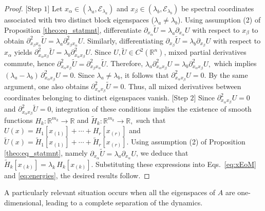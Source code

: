 \documentclass{rendiconti}
\begin{document}
\begin{proof}
%
$[$Step $1]$
Let $x_\alpha \in (\lambda_a, \mathcal{E}_{\lambda_a})$ and $x_\beta \in (\lambda_b, \mathcal{E}_{\lambda_b})$ be spectral coordinates associated with two distinct block eigenspaces ($\lambda_a \neq \lambda_b$). Using assumption (2) of Proposition \ref{theo:eq_statmnt}, differentiate $\partial_{x_\alpha} \widetilde U = \lambda_a \partial_{x_\alpha} U$ with respect to $x_\beta$ to obtain
$
\partial^2_{x_\beta x_\alpha} \widetilde U = \lambda_a \partial^2_{x_\beta x_\alpha} U.
$
Similarly, differentiating $\partial_{x_\beta} \widetilde U = \lambda_b \partial_{x_\beta} U$ with respect to $x_\alpha$ yields
$
\partial^2_{x_\alpha x_\beta} \widetilde U = \lambda_b \partial^2_{x_\alpha x_\beta} U.
$
Since $U, \widetilde U \in C^2(\mathbb{R}^n)$, mixed partial derivatives commute, hence
$
\partial^2_{x_\alpha x_\beta} \widetilde U = \partial^2_{x_\beta x_\alpha} \widetilde U.
$
Therefore,
$
\lambda_a \partial^2_{x_\alpha x_\beta} U = \lambda_b \partial^2_{x_\alpha x_\beta} U,
$
which implies
$
(\lambda_a - \lambda_b)\, \partial^2_{x_\alpha x_\beta} U = 0.
$
Since $\lambda_a \neq \lambda_b$, it follows that
$
\partial^2_{x_\alpha x_\beta} U = 0.
$
By the same argument, one also obtains $\partial^2_{x_\alpha x_\beta} \widetilde U = 0$. Thus, all mixed derivatives between coordinates belonging to distinct eigenspaces vanish.
$[$Step $2]$
Since $\partial^2_{x_\alpha x_\beta} U = 0$ and $\partial^2_{x_\alpha x_\beta} \widetilde U = 0$, integration of these conditions implies the existence of smooth functions
$
H_k : \mathbb{R}^{m_k} \to \mathbb{R}$ and 
$\widetilde H_k : \mathbb{R}^{m_k} \to \mathbb{R},
$
such that
$
U(x) = H_1[x_{(1)}] + \cdots + H_r[x_{(r)}]$ and 
$\widetilde U(x) = \widetilde H_1[x_{(1)}] + \cdots + \widetilde H_r[x_{(r)}].
$
Using assumption (2) of Proposition \ref{theo:eq_statmnt}, namely $\partial_{x_\alpha} \widetilde U = \lambda_a \partial_{x_\alpha} U$, we deduce that
$
\widetilde H_k[x_{(k)}] = \lambda_k\, H_k[x_{(k)}].
$
Substituting these expressions into Eqs.~\eqref{eq:xEoM} and \eqref{eq:energies}, the desired results follow.
\end{proof}
%
A particularly relevant situation occurs when all the eigenspaces of $A$
are one-dimensional, leading to a complete separation of the dynamics.
%
\end{document}
